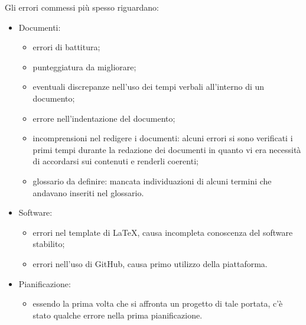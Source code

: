 \documentclass[../piano_di_qualifica.tex]{subfiles}
\begin{document}
Gli errori commessi più spesso riguardano:
\begin{itemize}
	\item Documenti:
	      \begin{itemize}
		      \item errori di battitura;
		      \item punteggiatura da migliorare;
		      \item eventuali discrepanze nell'uso dei tempi verbali all'interno di un documento;
		      \item errore nell'indentazione del documento;
		      \item incomprensioni nel redigere i documenti: alcuni errori si sono verificati i primi tempi durante la redazione dei documenti in quanto
		            vi era necessità di accordarsi sui contenuti e renderli coerenti;
		      \item glossario da definire: mancata individuazioni di alcuni termini che andavano inseriti nel glossario.
	      \end{itemize}
	\item Software:
	      \begin{itemize}
		      \item errori nel template di \LaTeX, causa incompleta conoscenza del software stabilito;
		      \item errori nell'uso di GitHub, causa primo utilizzo della piattaforma.
	      \end{itemize}
	\item Pianificazione:
	      \begin{itemize}
		      \item essendo la prima volta che si affronta un progetto di tale portata, c'è stato qualche errore nella prima pianificazione.
	      \end{itemize}
\end{itemize}
\end{document}
